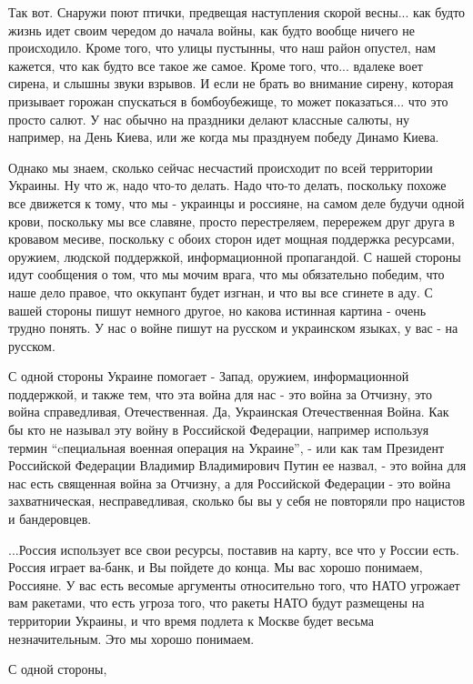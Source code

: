 Так вот. Снаружи поют птички, предвещая наступления скорой весны... как будто
жизнь идет своим чередом до начала войны, как будто вообще ничего не
происходило. Кроме того, что улицы пустынны, что наш район опустел, нам
кажется, что как будто все такое же самое. Кроме того, что... вдалеке воет
сирена, и слышны звуки взрывов.  И если не брать во внимание сирену, которая
призывает горожан спускаться в бомбоубежище, то может показаться... что это
просто салют. У нас обычно на праздники делают классные салюты, ну например, на
День Киева, или же когда мы празднуем победу Динамо Киева.

Однако мы знаем, сколько сейчас несчастий происходит по всей территории
Украины. Ну что ж, надо что-то делать. Надо что-то делать, поскольку похоже все
движется к тому, что мы - украинцы и россияне, на самом деле будучи одной
крови, поскольку мы все славяне, просто перестреляем, перережем друг друга в
кровавом месиве, поскольку с обоих сторон идет мощная поддержка ресурсами,
оружием, людской поддержкой, информационной пропагандой. С нашей стороны идут
сообщения о том, что мы мочим врага, что мы обязательно победим, что наше дело
правое, что оккупант будет изгнан, и что вы все сгинете в аду. С вашей стороны
пишут немного другое, но какова истинная картина - очень трудно понять.  У нас
о войне пишут на русском и украинском языках, у вас - на русском.

С одной стороны Украине помогает - Запад, оружием, информационной поддержкой, и
также тем, что эта война для нас - это война за Отчизну, это война
справедливая, Отечественная. Да, Украинская Отечественная Война. Как бы кто не
называл эту войну в Российской Федерации, например используя термин
\enquote{cпециальная военная операция на Украине}, - или как там Президент
Российской Федерации Владимир Владимирович Путин ее назвал, - это война для нас
есть священная война за Отчизну, а для Российской Федерации - это война
захватническая, несправедливая, сколько бы вы у себя не повторяли про нацистов
и бандеровцев. 

...Россия использует все свои ресурсы, поставив на карту, все что у России
есть. Россия играет ва-банк, и Вы пойдете до конца. Мы вас хорошо понимаем,
Россияне. У вас есть весомые аргументы относительно того, что НАТО угрожает вам
ракетами, что есть угроза того, что ракеты НАТО будут размещены на территории
Украины, и что время подлета к Москве будет весьма незначительным. Это мы
хорошо понимаем. 

С одной стороны,
